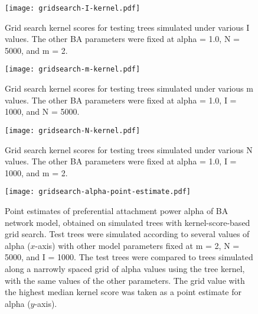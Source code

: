 \begin{figure}[ht]
    \centering
    \texttt{[image: gridsearch-I-kernel.pdf]}
    \caption{                                              
        Grid search kernel scores for testing trees simulated under various
        \gls{I} values. The other \gls{BA} parameters were fixed at \gls{alpha}
        = 1.0, \gls{N} = 5000, and \gls{m} = 2. 
    }        
    \label{fig:gridI}
\end{figure}

\begin{figure}[ht]
    \centering
    \texttt{[image: gridsearch-m-kernel.pdf]}
    \caption{                                              
        Grid search kernel scores for testing trees simulated under various
        \gls{m} values. The other \gls{BA} parameters were fixed at \gls{alpha}
        = 1.0, \gls{I} = 1000, and \gls{N} = 5000.
    }        
    \label{fig:gridm}
\end{figure}

\begin{figure}[ht]
    \centering
    \texttt{[image: gridsearch-N-kernel.pdf]}
    \caption{                                              
        Grid search kernel scores for testing trees simulated under various
        \gls{N} values. The other \gls{BA} parameters were fixed at \gls{alpha}
        = 1.0, \gls{I} = 1000, and \gls{m} = 2.
    }        
    \label{fig:gridN}
\end{figure}

\begin{figure}[ht]
    \centering
    \texttt{[image: gridsearch-alpha-point-estimate.pdf]}
    \caption[
        Point estimates of preferential attachment power \gls{alpha} of
        \gls{BA} network model, obtained on simulated trees with
        kernel-score-based grid search.
    ]{
        Point estimates of preferential attachment power \gls{alpha} of
        \acrlong{BA} network model, obtained on simulated trees with
        kernel-score-based grid search. Test trees were simulated according to
        several values of \gls{alpha} ($x$-axis) with other model parameters
        fixed at \gls{m} = 2, \gls{N} = 5000, and \gls{I} = 1000. The test
        trees were compared to trees simulated along a narrowly spaced grid of
        \gls{alpha} values using the tree kernel, with the same values of the
        other parameters. The grid value with the highest median kernel score
        was taken as a point estimate for \gls{alpha} ($y$-axis).
    }
    \label{fig:gridptalpha}
\end{figure}

